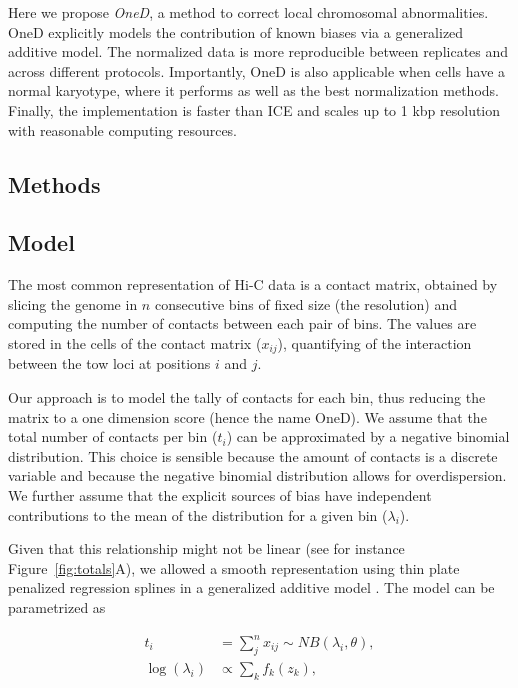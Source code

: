 \documentclass{bioinfo}
\begin{document}
Here we propose \textit{OneD}, a method to correct local chromosomal
abnormalities. OneD explicitly models the contribution of known biases via
a generalized additive model. The normalized data is more reproducible
between replicates and across different protocols. Importantly, OneD is
also applicable when cells have a normal karyotype, where it performs as
well as the best normalization methods. Finally, the implementation is
faster than ICE and scales up to 1 kbp resolution with reasonable
computing resources.


\begin{methods}

\section{Methods}

\subsection{Model}

The most common representation of Hi-C data is a contact matrix, obtained
by slicing the genome in $n$ consecutive bins of fixed size (the
resolution) and computing the number of contacts between each pair of
bins. The values are stored in the cells of the contact matrix ($x_{ij}$),
quantifying of the interaction between the tow loci at positions $i$ and
$j$.

Our approach is to model the tally of contacts for each bin, thus reducing
the matrix to a one dimension score (hence the name OneD). We assume that
the total number of contacts per bin ($t_{i}$) can be approximated by a
negative binomial distribution. This choice is sensible because the amount
of contacts is a discrete variable and because the negative binomial
distribution allows for overdispersion. We further assume that the
explicit sources of bias have independent contributions to the mean of the
distribution for a given bin ($\lambda_i$).

Given that this relationship might not be linear (see for instance
Figure~\ref{fig:totals}A), we allowed a smooth representation
using thin plate penalized regression splines \citep{wood2003thin} in a
generalized additive model \citep{wood2011fast}. The model can be
parametrized as

\begin{align*}
t_i &= \sum_j^n{x_{ij}} \sim  NB(\lambda_i, \theta), \\
\log(\lambda_i) &\propto \sum_{k}{f_k(z_k)},
\end{align*}


\end{methods}
\end{document}
